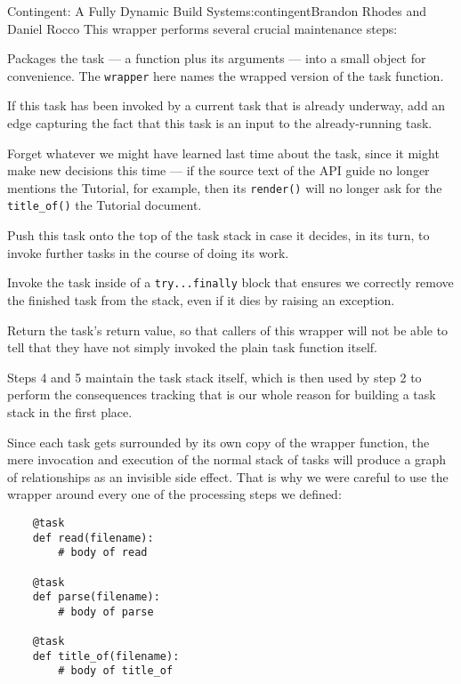 \begin{aosachapter}{Contingent: A Fully Dynamic Build System}{s:contingent}{Brandon Rhodes and Daniel Rocco}
This wrapper performs several crucial maintenance steps:

\begin{aosaenumerate}
\def\labelenumi{\arabic{enumi}.}
\item
  Packages the task --- a function plus its arguments --- into a small
  object for convenience. The \texttt{wrapper} here names the wrapped
  version of the task function.
\item
  If this task has been invoked by a current task that is already
  underway, add an edge capturing the fact that this task is an input to
  the already-running task.
\item
  Forget whatever we might have learned last time about the task, since
  it might make new decisions this time --- if the source text of the
  API guide no longer mentions the Tutorial, for example, then its
  \texttt{render()} will no longer ask for the \texttt{title\_of()} the
  Tutorial document.
\item
  Push this task onto the top of the task stack in case it decides, in
  its turn, to invoke further tasks in the course of doing its work.
\item
  Invoke the task inside of a \texttt{try...finally} block that ensures
  we correctly remove the finished task from the stack, even if it dies
  by raising an exception.
\item
  Return the task's return value, so that callers of this wrapper will
  not be able to tell that they have not simply invoked the plain task
  function itself.
\end{aosaenumerate}

Steps 4 and 5 maintain the task stack itself, which is then used by step
2 to perform the consequences tracking that is our whole reason for
building a task stack in the first place.

Since each task gets surrounded by its own copy of the wrapper function,
the mere invocation and execution of the normal stack of tasks will
produce a graph of relationships as an invisible side effect. That is
why we were careful to use the wrapper around every one of the
processing steps we defined:

\begin{verbatim}
    @task
    def read(filename):
        # body of read

    @task
    def parse(filename):
        # body of parse

    @task
    def title_of(filename):
        # body of title_of


\end{verbatim}
\end{aosachapter}
